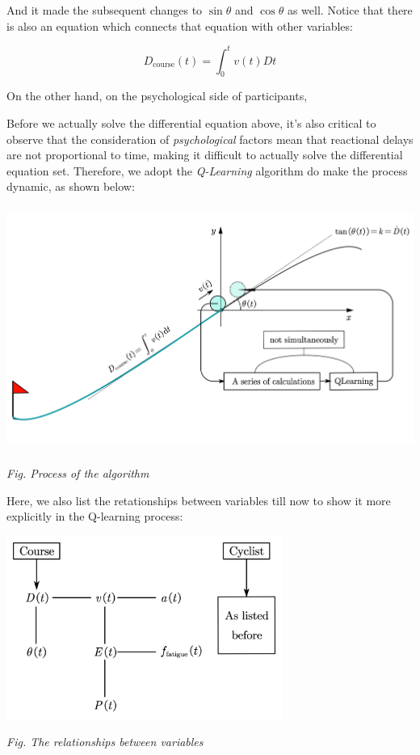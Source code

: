 \documentclass{article}
\begin{document}
			And it made the subsequent changes to \( \sin\theta \) and \(\cos \theta\) as well. Notice that there is also an equation which connects that equation with other variables:

			\[ D_{\mathrm{course}}\left( t \right) =\int_0^t{v\left( t \right)  D t} \]

			On the other hand, on the psychological side of participants,

			Before we actually solve the differential equation above, it's also critical to observe that the consideration of \textit{psychological} factors mean that reactional delays are not proportional to time, making it difficult to actually solve the differential equation set. Therefore, we adopt the \textit{Q-Learning} algorithm do make the process dynamic, as shown below:

			\begin{center}
				\includegraphics[height=8cm]{Recalculating speed function.png}

				\small\textit{Fig. Process of the algorithm}
			\end{center}

			Here, we also list the retationships between variables till now to show it more explicitly in the Q-learning process:\

			\begin{center}
				\includegraphics[height = 6cm]{the relationship between variables.png}

				\small\textit{Fig. The relationships between variables}
			\end{center}
\end{document}
